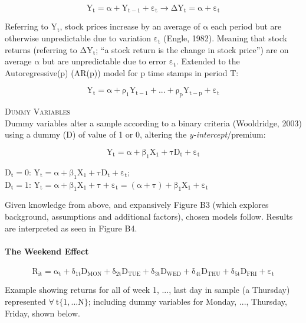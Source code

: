 \documentclass[11pt, english]{article}
\begin{document}
		$$\mathrm{Y_t=\alpha+Y_{t-1}+\varepsilon_t\rightarrow\Delta Y_t=\alpha+\varepsilon_t}$$

		Referring to $\mathrm{Y_t}$, stock prices increase by an average of $\mathrm{\alpha}$ each period but are otherwise unpredictable due to variation $\mathrm{\varepsilon_t}$ (Engle, 1982). Meaning that stock returns (referring to $\mathrm{\Delta Y_t}$; ``a stock return is the change in stock price'') are on average $\mathrm{\alpha}$ but are unpredictable due to error $\mathrm{\varepsilon_t}$. Extended to the Autoregressive(p) (AR(p)) model for p time stamps in period T:

		$$\mathrm{Y_t=\alpha+\rho_1Y_{t-1}+...+\rho_pY_{t-p}+\varepsilon_t}$$

		\textsc{Dummy Variables}\\

		Dummy variables alter a sample according to a binary criteria (Wooldridge, 2003) using a dummy (D) of value of 1 or 0, altering the \textit{y-intercept}/premium:

		$$\mathrm{Y_t=\alpha+\beta_1X_1+\tau D_t+\varepsilon_t}$$

		$\mathrm{D_t=0}$: $\mathrm{Y_t=\alpha+\beta_1X_1+\tau D_t+\varepsilon_t;}$\\ $\mathrm{D_t=1}$: $\mathrm{Y_t=\alpha+\beta_1X_1+\tau+\varepsilon_t=(\alpha+\tau)+\beta_1X_1+\varepsilon_t}$

	\newpage
	
		Given knowledge from above, and expansively Figure B3 (which explores background, assumptions and additional factors), chosen models follow. Results are interpreted as seen in Figure B4.

		\paragraph{The Weekend Effect}

		$$\mathrm{R_{it}=\alpha_t+\delta_{1t}D_{MON}+\delta_{2t}D_{TUE}+\delta_{3t}D_{WED}+\delta_{4t}D_{THU}+\delta_{5t}D_{FRI}+\varepsilon_t}$$
		
		Example showing returns for all of week 1, ..., last day in sample (a Thursday) represented $\mathrm{\forall\ t\{1,...N\}}$; including dummy variables for Monday, ..., Thursday, Friday, shown below.
\end{document}

